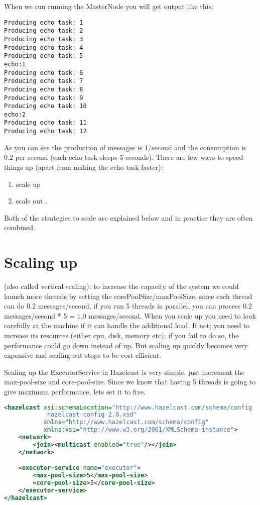 When we run running the MasterNode you will get output like this:
\begin{verbatim}
Producing echo task: 1
Producing echo task: 2
Producing echo task: 3
Producing echo task: 4
Producing echo task: 5
echo:1
Producing echo task: 6
Producing echo task: 7
Producing echo task: 8
Producing echo task: 9
Producing echo task: 10
echo:2
Producing echo task: 11
Producing echo task: 12	
\end{verbatim}

As you can see the production of messages is 1/second and the consumption is 0.2 per second (each echo task sleeps 5 seconds). There are few ways to speed things up (apart from making the echo task faster):
\begin{enumerate}
\item scale up 
\item scale out .
\end{enumerate}
Both of the strategies to scale are explained below and in practice they are often combined. 

\section{Scaling up}
(also called vertical scaling): to increase the capacity of the system we could launch more threads by setting the corePoolSize/maxPoolSize, since each thread can do 0.2 messages/second, if you run 5 threads in parallel, you can process 0.2 messages/second * 5 = 1.0 messages/second. When you scale up you need to look carefully at the machine if it can handle the additional load. If not; you need to increase its resources (either cpu, disk, memory etc); if you fail to do so, the performance could go down instead of up. But scaling up quickly becomes very expensive and scaling out stops to be cost efficient. 

Scaling up the ExecutorService in Hazelcast is very simple, just increment the max-pool-size and core-pool-size. Since we know that having 5 threads is going to give maximum performance, lets set it to five.
\begin{lstlisting}[language=xml]
<hazelcast xsi:schemaLocation="http://www.hazelcast.com/schema/config
            hazelcast-config-2.0.xsd"
           xmlns="http://www.hazelcast.com/schema/config"
           xmlns:xsi="http://www.w3.org/2001/XMLSchema-instance">
    <network>
        <join><multicast enabled="true"/></join>
    </network>

    <executor-service name="executor">
        <max-pool-size>5</max-pool-size>
        <core-pool-size>5</core-pool-size>
    </executor-service>
</hazelcast>
\end{lstlisting}

